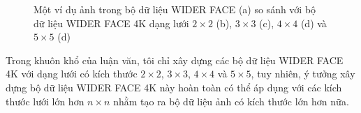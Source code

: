 {    \begin{figure}[H]
        \centering
        \caption{Một ví dụ ảnh trong bộ dữ liệu WIDER FACE \cite{yang2016wider} (a) so sánh với bộ dữ liệu WIDER FACE 4K dạng lưới $2 \times 2$ (b), $3 \times 3$ (c), $4 \times 4$ (d) và $5 \times 5$ (d)}
        \label{fig:widerface_4k_example}
    \end{figure}

    \noindent
    Trong khuôn khổ của luận văn, tôi chỉ xây dựng các bộ dữ liệu WIDER FACE 4K với dạng lưới có kích thước $2 \times 2$, $3 \times 3$, $4 \times 4$ và $5 \times 5$, tuy nhiên, ý tưởng xây dựng bộ dữ liệu WIDER FACE 4K này hoàn toàn có thể áp dụng với các kích thước lưới lớn hơn $n \times n$ nhằm tạo ra bộ dữ liệu ảnh có kích thước lớn hơn nữa.

}
